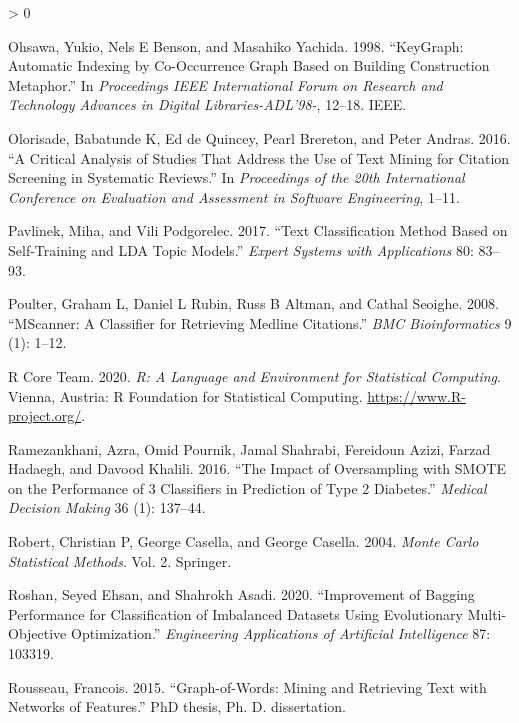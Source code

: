 \documentclass{article}
\newlength{\cslhangindent}
\newenvironment{CSLReferences}[2] %
 {%
  \setlength{\parindent}{0pt}
  \ifodd #1 \everypar{\setlength{\hangindent}{\cslhangindent}}\ignorespaces\fi
  \ifnum #2 > 0
  \setlength{\parskip}{#2\baselineskip}
  \fi
 }%
 {}
\begin{document}
\begin{CSLReferences}{1}{0}
\leavevmode\hypertarget{ref-ohsawa1998keygraph}{}%
Ohsawa, Yukio, Nels E Benson, and Masahiko Yachida. 1998. {``KeyGraph:
Automatic Indexing by Co-Occurrence Graph Based on Building Construction
Metaphor.''} In \emph{Proceedings IEEE International Forum on Research
and Technology Advances in Digital Libraries-ADL'98-}, 12--18. IEEE.

\leavevmode\hypertarget{ref-olorisade2016critical}{}%
Olorisade, Babatunde K, Ed de Quincey, Pearl Brereton, and Peter Andras.
2016. {``A Critical Analysis of Studies That Address the Use of Text
Mining for Citation Screening in Systematic Reviews.''} In
\emph{Proceedings of the 20th International Conference on Evaluation and
Assessment in Software Engineering}, 1--11.

\leavevmode\hypertarget{ref-pavlinek2017text}{}%
Pavlinek, Miha, and Vili Podgorelec. 2017. {``Text Classification Method
Based on Self-Training and LDA Topic Models.''} \emph{Expert Systems
with Applications} 80: 83--93.

\leavevmode\hypertarget{ref-poulter2008mscanner}{}%
Poulter, Graham L, Daniel L Rubin, Russ B Altman, and Cathal Seoighe.
2008. {``MScanner: A Classifier for Retrieving Medline Citations.''}
\emph{BMC Bioinformatics} 9 (1): 1--12.

\leavevmode\hypertarget{ref-rstat}{}%
R Core Team. 2020. \emph{R: A Language and Environment for Statistical
Computing}. Vienna, Austria: R Foundation for Statistical Computing.
\url{https://www.R-project.org/}.

\leavevmode\hypertarget{ref-ramezankhani2016impact}{}%
Ramezankhani, Azra, Omid Pournik, Jamal Shahrabi, Fereidoun Azizi,
Farzad Hadaegh, and Davood Khalili. 2016. {``The Impact of Oversampling
with SMOTE on the Performance of 3 Classifiers in Prediction of Type 2
Diabetes.''} \emph{Medical Decision Making} 36 (1): 137--44.

\leavevmode\hypertarget{ref-robert2004monte}{}%
Robert, Christian P, George Casella, and George Casella. 2004.
\emph{Monte Carlo Statistical Methods}. Vol. 2. Springer.

\leavevmode\hypertarget{ref-roshan2020improvement}{}%
Roshan, Seyed Ehsan, and Shahrokh Asadi. 2020. {``Improvement of Bagging
Performance for Classification of Imbalanced Datasets Using Evolutionary
Multi-Objective Optimization.''} \emph{Engineering Applications of
Artificial Intelligence} 87: 103319.

\leavevmode\hypertarget{ref-rousseau2015graph}{}%
Rousseau, Francois. 2015. {``Graph-of-Words: Mining and Retrieving Text
with Networks of Features.''} PhD thesis, Ph. D. dissertation.


\end{CSLReferences}
\end{document}

